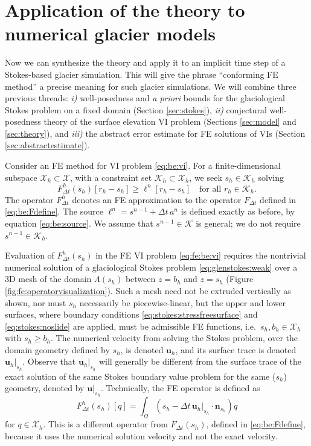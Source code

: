 \documentclass[hidelinks,onefignum,onetabnum,final]{siamart220329}  %
\newcommand{\bn}{\mathbf{n}}
\newcommand{\bu}{\mathbf{u}}
\newcommand{\cK}{\mathcal{K}}
\newcommand{\cX}{\mathcal{X}}
\begin{document}
\section{Application of the theory to numerical glacier models} \label{sec:application}

Now we can synthesize the theory and apply it to an implicit time step of a Stokes-based glacier simulation.  This will give the phrase ``conforming FE method'' a precise meaning for such glacier simulations.  We will combine three previous threads: \emph{i)} well-posedness and \emph{a priori} bounds for the glaciological Stokes problem on a fixed domain (Section \ref{sec:stokes}), \emph{ii)} conjectural well-posedness theory of the surface elevation VI problem (Sections \ref{sec:model} and \ref{sec:theory}), and \emph{iii)} the abstract error estimate for FE solutions of VIs (Section \ref{sec:abstractestimate}).

Consider an FE method for VI problem \eqref{eq:be:vi}.  For a finite-dimensional subspace $\cX_h\subset \cX$, with a constraint set $\cK_h\subset \cX_h$, we seek $s_h\in\cK_h$ solving
\begin{equation}
F^h_{\Delta t}(s_h)[r_h-s_h] \ge \ell^n[r_h-s_h] \quad \text{for all } r_h \in \cK_h. \label{eq:fe:be:vi}
\end{equation}
The operator $F^h_{\Delta t}$ denotes an FE approximation to the operator $F_{\Delta t}$ defined in \eqref{eq:be:Fdefine}.  The source $\ell^n = s^{n-1} + \Delta t\,a^n$ is defined exactly as before, by equation \eqref{eq:be:source}.  We assume that $s^{n-1} \in \cK$ is general; we do not require $s^{n-1}\in\cK_h$.

Evaluation of $F^h_{\Delta t}(s_h)$ in the FE VI problem \eqref{eq:fe:be:vi} requires the nontrivial numerical solution of a glaciological Stokes problem \eqref{eq:glenstokes:weak} over a 3D mesh of the domain $\Lambda(s_h)$ between $z=b_h$ and $z=s_h$ (Figure \ref{fig:fe:operatorvisualization}).  Such a mesh need not be extruded vertically as shown, nor must $s_h$ necessarily be piecewise-linear, but the upper and lower surfaces, where boundary conditions \eqref{eq:stokes:stressfreesurface} and \eqref{eq:stokes:noslide} are applied, must be admissible FE functions, i.e.~$s_h,b_h\in\cX_h$ with $s_h\ge b_h$.  The numerical velocity from solving the Stokes problem, over the domain geometry defined by $s_h$, is denoted $\bu_h$, and its surface trace is denoted $\bu_h|_{s_h}$.  Observe that $\bu_h|_{s_h}$ will generally be different from the surface trace of the exact solution of the same Stokes boundary value problem for the same ($s_h$) geometry, denoted by $\bu|_{s_h}$.  Technically, the FE operator is defined as
\begin{equation}
F_{\Delta t}^h(s_h)[q] = \int_\Omega \left(s_h - \Delta t\, \bu_h|_{s_h}\cdot \bn_{s_h}\right) q
\label{eq:fe:be:Fdefine}
\end{equation}
for $q\in\cX_h$.  This is a different operator from $F_{\Delta t}(s_h)$, defined in \eqref{eq:be:Fdefine}, because it uses the numerical solution velocity and not the exact velocity.
\end{document}
